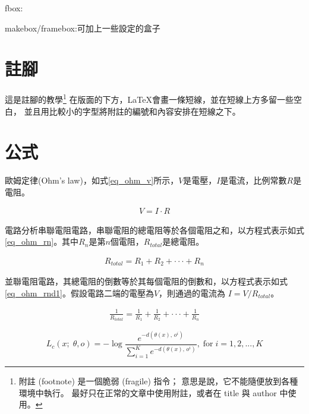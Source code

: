 fbox:

makebox/framebox:可加上一些設定的盒子

\hbox{}


\newpage
\section{註腳}
這是註腳的教學\footnote{附註 (footnote) 是一個脆弱 (fragile) 指令； 意思是說，它不能隨便放到各種環境中執行。 最好只在正常的文章中使用附註，或者在 title 與 author 中使用。}
在版面的下方，\LaTeX 會畫一條短線，並在短線上方多留一些空白， 並且用比較小的字型將附註的編號和內容安排在短線之下。
\newpage

\section{公式}

歐姆定律(Ohm's law)，如式\ref{eq_ohm_v}所示，$V$是電壓，$I$是電流，比例常數$R$是電阻。

\begin{equation}\label{eq_ohm_v}
    \begin{split}
        V = I \cdot R
    \end{split}
\end{equation}

電路分析串聯電阻電路，串聯電阻的總電阻等於各個電阻之和，以方程式表示如式\ref{eq_ohm_rn}。其中$R_{n}$是第$n$個電阻，$R_{total}$是總電阻。

\begin{equation}\label{eq_ohm_rn}
    \begin{split}
        R_{total} = R_{1} + R_{2} + \cdot\cdot\cdot + R_{n}
    \end{split}
\end{equation}

並聯電阻電路，其總電阻的倒數等於其每個電阻的倒數和，以方程式表示如式\ref{eq_ohm_rnd1}。假設電路二端的電壓為$V$，則通過的電流為 $I = V / R_{total}$。

\begin{equation}\label{eq_ohm_rnd1}
    \begin{split}
        \frac{1}{R_{total}} = \frac{1}{R_{1}} + \frac{1}{R_{2}} + \cdot\cdot\cdot + \frac{1}{R_{n}}
    \end{split}
\end{equation}

\begin{equation}
{L_c(x;\;\theta,o) = -\log\frac{{e}^{-d(\theta(x),\,o^i)}}{\sum_{i=1}^{K}{e}^{-d(\theta(x),\,o^i)}},\;\mathrm{for}\;i=1,2,...,K}
\label{equ: close-set loss}
\end{equation}
